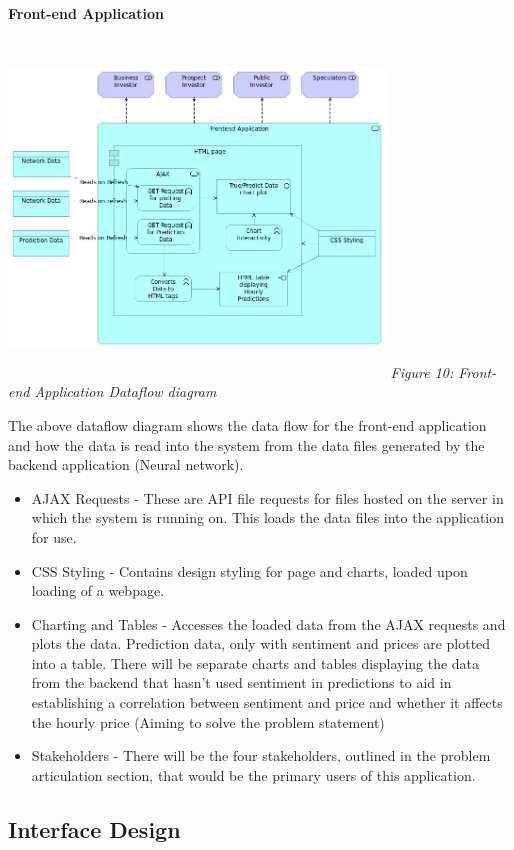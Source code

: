\documentclass[oneside, 12pt]{article}
\begin{document}
		\textbf{Front-end Application}
		\begin{center}
			\includegraphics[width=10cm,height=9cm]{images/Frontend_Application.png}
			\newline
			\textit{Figure 10: Front-end Application Dataflow diagram}
		\end{center}
		The above dataflow diagram shows the data flow for the front-end application and how the data is read into the system from the data files generated by the backend application (Neural network).
		\begin{itemize}
			\item AJAX Requests - These are API file requests for files hosted on the server in which the system is running on. This loads the data files into the application for use.
			\item CSS Styling - Contains design styling for page and charts, loaded upon loading of a webpage.
			\item Charting and Tables - Accesses the loaded data from the AJAX requests and plots the data. Prediction data, only with sentiment and prices are plotted into a table. There will be separate charts and tables displaying the data from the backend that hasn't used sentiment in predictions to aid in establishing a correlation between sentiment and price and whether it affects the hourly price (Aiming to solve the problem statement)
			\item Stakeholders - There will be the four stakeholders, outlined in the problem articulation section, that would be the primary users of this application.
		\end{itemize}
		
		\subsection{Interface Design}
	
\end{document}
